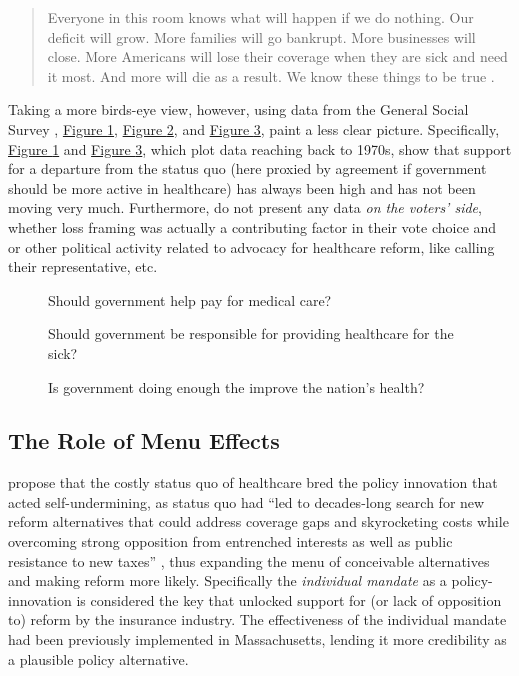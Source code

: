 \documentclass[11pt]{article}
\begin{document}
\begin{quote}
  Everyone in this room knows what will happen if we do nothing. Our deficit will grow. More families will go bankrupt. More businesses will close. More Americans will lose their coverage when they are sick and need it most. And more will die as a result. We know these things to be true \parencite[][]{Obama2009}.
\end{quote}

Taking a more birds-eye view, however, using data from the General Social Survey \parencite[][]{GSS}, \hyperref[fig:gss1]{Figure \ref*{fig:gss1}}, \hyperref[fig:gss2]{Figure \ref*{fig:gss2}},  and \hyperref[fig:gss3]{Figure \ref*{fig:gss3}}, paint a less clear picture. Specifically, \hyperref[fig:gss1]{Figure \ref*{fig:gss1}} and \hyperref[fig:gss3]{Figure \ref*{fig:gss3}}, which plot data reaching back to 1970s, show that support for a departure from the status quo (here proxied by agreement if government should be more active in healthcare) has always been high and has not been moving very much. Furthermore, \textcite[][]{Jacobs2014} do not present any data \textit{on the voters' side}, whether loss framing was actually a contributing factor in their vote choice and or other political activity related to advocacy for healthcare reform, like calling their representative, etc.

\begin{figure}[!ht]
  \sffamily
  \caption{Should government help pay for medical care?}
  
  \label{fig:gss1}
\end{figure}

\begin{figure}[!ht]
  \sffamily
  \caption{Should government be responsible for providing healthcare for the sick?}
  
  \label{fig:gss2}
\end{figure}

\begin{figure}[!ht]
  \sffamily
  \caption{Is government doing enough the improve the nation's health?}
  
  \label{fig:gss3}
\end{figure}

\subsection*{The Role of Menu Effects}

\textcite[][]{Jacobs2014} propose that the costly status quo of healthcare bred the policy innovation that acted self-undermining, as status quo had \enquote{led to decades-long search for new reform alternatives that could address coverage gaps and skyrocketing costs while overcoming strong opposition from entrenched interests as well as public resistance to new taxes} , thus expanding the menu of conceivable alternatives and making reform more likely. Specifically the \textit{individual mandate} as a policy-innovation is considered the key that unlocked support for (or lack of opposition to) reform by the insurance industry. The effectiveness of the individual mandate had been previously implemented in Massachusetts, lending it more credibility as a plausible policy alternative.
\end{document}
